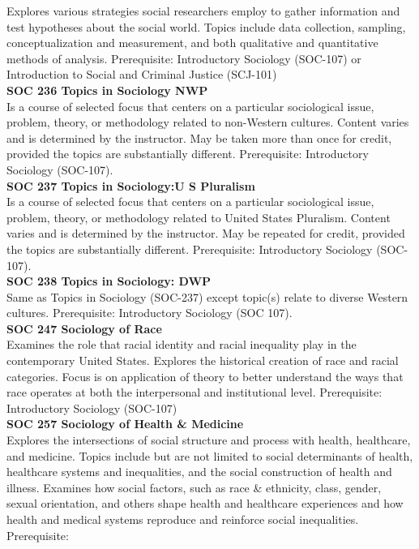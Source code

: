 \documentclass[
  letterpaper,
]{scrbook}
\begin{document}
Explores various strategies social researchers employ to gather
information and test hypotheses about the social world. Topics include
data collection, sampling, conceptualization and measurement, and both
qualitative and quantitative methods of analysis. Prerequisite:
Introductory Sociology (SOC-107) or Introduction to Social and Criminal
Justice (SCJ-101)\\
\textbf{SOC 236 Topics in Sociology NWP}\\
Is a course of selected focus that centers on a particular sociological
issue, problem, theory, or methodology related to non-Western cultures.
Content varies and is determined by the instructor. May be taken more
than once for credit, provided the topics are substantially different.
Prerequisite: Introductory Sociology (SOC-107).\\
\textbf{SOC 237 Topics in Sociology:U S Pluralism}\\
Is a course of selected focus that centers on a particular sociological
issue, problem, theory, or methodology related to United States
Pluralism. Content varies and is determined by the instructor. May be
repeated for credit, provided the topics are substantially different.
Prerequisite: Introductory Sociology (SOC-107).\\
\textbf{SOC 238 Topics in Sociology: DWP}\\
Same as Topics in Sociology (SOC-237) except topic(s) relate to diverse
Western cultures. Prerequisite: Introductory Sociology (SOC 107).\\
\textbf{SOC 247 Sociology of Race}\\
Examines the role that racial identity and racial inequality play in the
contemporary United States. Explores the historical creation of race and
racial categories. Focus is on application of theory to better
understand the ways that race operates at both the interpersonal and
institutional level. Prerequisite: Introductory Sociology (SOC-107)\\
\textbf{SOC 257 Sociology of Health \& Medicine}\\
Explores the intersections of social structure and process with health,
healthcare, and medicine. Topics include but are not limited to social
determinants of health, healthcare systems and inequalities, and the
social construction of health and illness. Examines how social factors,
such as race \& ethnicity, class, gender, sexual orientation, and others
shape health and healthcare experiences and how health and medical
systems reproduce and reinforce social inequalities. Prerequisite:
\end{document}
